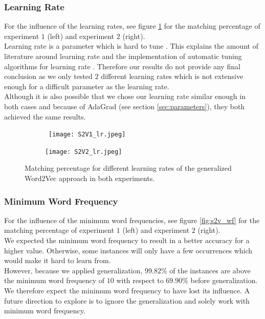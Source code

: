 \subsubsection{Learning Rate}

For the influence of the learning rates, see figure \ref{fig:s2v_lr} for the matching percentage of experiment $1$ (left) and experiment $2$ (right). \\
Learning rate is a parameter which is hard to tune \cite{peskyLr:article}. This explains the amount of literature around learning rate and the implementation of automatic tuning algorithms for learning rate \cite{peskyLr:article} \cite{adagrad:article} \cite{lrHard:article}. Therefore our results do not provide any final conclusion as we only tested $2$ different learning rates which is not extensive enough for a difficult parameter as the learning rate. \\
Although it is also possible that we chose our learning rate similar enough in both cases and because of AdaGrad (see section \ref{sec:parameters}), they both achieved the same results.

\begin{figure}[!htb]
	\centering
	\begin{subfigure}[b]{.49\textwidth}\
		\texttt{[image: S2V1\_lr.jpeg]}
	\end{subfigure}
	\begin{subfigure}[b]{.49\textwidth}
		\texttt{[image: S2V2\_lr.jpeg]}
	\end{subfigure}
	\caption{Matching percentage for different learning rates of the generalized Word2Vec 		approach in both experiments.}
	\label{fig:s2v_lr}
\end{figure}



\subsubsection{Minimum Word Frequency}

For the influence of the minimum word frequencies, see figure \ref{fig:s2v_wf} for the matching percentage of experiment $1$ (left) and experiment $2$ (right). \\
We expected the minimum word frequency to result in a better accuracy for a higher value. Otherwise, some instances will only have a few occurrences which would make it hard to learn from. \\
However, because we applied generalization, $99.82$\% of the instances are above the minimum word frequency of $10$ with respect to $69.90$\% before generalization. We therefore expect the minimum word frequency to have lost its influence. A future direction to explore is to ignore the generalization and solely work with minimum word frequency.

